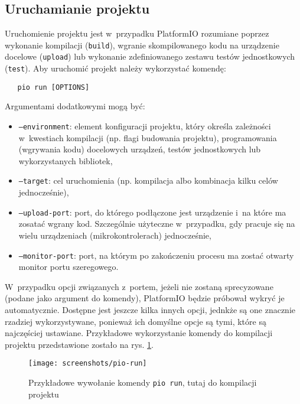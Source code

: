 \subsection{Uruchamianie projektu\label{sect:pio-run}} Uruchomienie projektu jest w~przypadku PlatformIO rozumiane
poprzez wykonanie kompilacji (\texttt{build}), wgranie skompilowanego kodu na urządzenie docelowe (\texttt{upload}) lub
wykonanie zdefiniowanego zestawu testów jednostkowych (\texttt{test}). Aby uruchomić projekt należy wykorzystać komendę:
\begin{verbatim}
   pio run [OPTIONS]
\end{verbatim}
Argumentami dodatkowymi mogą być:
\begin{itemize}[label=]
    \item \texttt{--environment}: element konfiguracji projektu, który określa zależności w~kwestiach
          kompilacji (np. flagi budowania projektu), programowania (wgrywania kodu) docelowych urządzeń, testów
          jednostkowych lub wykorzystanych bibliotek,
    \item \texttt{--target}: cel uruchomienia (np. kompilacja albo kombinacja kilku celów jednocześnie),
    \item \texttt{--upload-port}: port, do którego podłączone jest urządzenie i~na które ma zosatać wgrany kod.
          Szczególnie użyteczne w~przypadku, gdy pracuje się na wielu urządzeniach (mikrokontrolerach) jednocześnie,
    \item \texttt{--monitor-port}: port, na którym po zakończeniu procesu ma zostać otwarty monitor portu szeregowego.
\end{itemize}
W~przypadku opcji związanych z~portem, jeżeli nie zostaną sprecyzowane (podane jako argument do komendy), PlatformIO
będzie próbował wykryć je automatycznie. Dostępne jest jeszcze kilka innych opcji, jednkże są one znacznie rzadziej
wykorzystywane, ponieważ ich domyślne opcje są tymi, które są najczęściej ustawiane. Przykładowe wykorzystanie komendy
do kompilacji projektu przedstawione zostało na rys. \ref{img:pio-run}.

\begin{figure}[!htbp]
    \centering
    \texttt{[image: screenshots/pio-run]}
    \caption{\label{img:pio-run}Przykładowe wywołanie komendy \texttt{pio run}, tutaj do kompilacji projektu}
\end{figure}

\FloatBarrier
